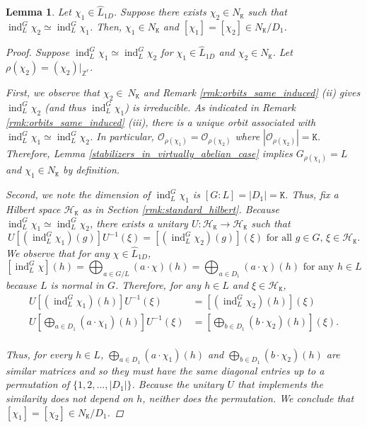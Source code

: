 \documentclass[11pt, twoside]{amsart}
\newcommand{\te}[1]{\operatorname{#1}}
\newcommand{\zn}{\mathbb{Z}}
\newcommand{\mc}{\mathcal}
\newcommand{\mt}{\mathtt}
\newcommand{\wh}{\widehat}
\renewcommand{\l}{\left}
\renewcommand{\r}{\right}
\newtheorem{lemma}[thm]{Lemma}
\theoremstyle{definition}
\begin{document}
\begin{lemma}\label{lemma: when_ind_is_irreducible}
Let $\chi_1\in\wh{L}_{1D}$. Suppose there exists $\chi_2\in N_{\mt K}$ such that $\te{ind}_L^G\chi_2\simeq \te{ind}_L^G\chi_1$. Then, $\chi_1\in N_{\mt K}$ and $[\chi_1]=[\chi_2]\in N_{\mt K}/D_1$.

\begin{proof}
    Suppose $\te{ind}_L^G\chi_1\simeq \te{ind}_L^G\chi_2$ for $\chi_1\in\wh{L}_{1D}$ and $\chi_2\in N_{\mt{K}}$. Let $\rho(\chi_2)=(\chi_2)|_{\zn^r}$.

    First, we observe that $\chi_2\in\ N_{\mt K}$ and Remark \ref{rmk:orbits_same_induced} (ii) gives $\te{ind}_L^G\chi_2$ (and thus $\te{ind}_L^G\chi_1$) is irreducible. As indicated in Remark \ref{rmk:orbits_same_induced} (iii), there is a unique orbit  associated with $\te{ind}_L^G\chi_1\simeq\te{ind}_L^G\chi_2$. In particular, $\mc{O}_{\rho(\chi_1)}=\mc{O}_{\rho(\chi_2)}$ where $|\mc{O}_{\rho(\chi_2)}|=\mt{K}$. Therefore, Lemma \ref{stabilizers_in_virtually_abelian_case} implies $G_{\rho(\chi_1)}=L$ and $\chi_1\in N_{\mt K}$ by definition.

    Second, we note the dimension of $\te{ind}_L^G \chi_1$ is $[G:L]=|D_1|={\mt{K}}$. Thus, fix a Hilbert space $\mc{H}_{\mt{K}}$ as in Section \ref{rmk:standard_hilbert}. Because $\te{ind}_L^G\chi_1\simeq \te{ind}_L^G\chi_2$, there exists a unitary $U:\mc{H}_{\mt{K}}\rightarrow \mc{H}_{\mt{K}}$ such that 
     \[U\l[\l(\te{ind}_L^G\chi_1\r)(g)\r]U^{-1}(\xi)=\l[\l(\te{ind}_L^G\chi_2\r)(g)\r](\xi)\text{ for all }g\in G,\,\xi\in \mc{H}_{\mt{K}}.\]
     We observe that for any $\chi\in\wh{L}_{1D}$,
     \[\l[\te{ind}_L^G\chi\r](h)=\bigoplus_{a\in G\slash L}(a\cdot \chi)(h)=\bigoplus_{a\in D_1}(a\cdot \chi)(h)\text{ for any }h\in L\]
     because $L$ is normal in $G$. Therefore, for any $h\in L$ and $\xi\in \mc{H}_{\mt{K}}$,
     \begin{align*}
     U\l[\l(\te{ind}_L^G\chi_1\r)(h)\r]U^{-1}(\xi)&=\l[\l(\te{ind}_L^G\chi_2\r)(h)\r](\xi)\\
     U\l[\bigoplus_{a\in D_1}(a\cdot \chi_1)(h)\r]U^{-1}(\xi)&=\l[\bigoplus_{b\in D_1}(b\cdot \chi_2)(h)\r](\xi).\\
     \end{align*}
     
    Thus, for every $h\in L$, $\bigoplus_{a\in D_1}(a\cdot \chi_1)(h)$ and $\bigoplus_{b\in D_1}(b\cdot \chi_2)(h)$ are similar matrices and so they must have the same diagonal entries up to a permutation of $\{1,2,...,|D_1|\}$. Because the unitary $U$ that implements the similarity does not depend on $h$, neither does the permutation. We conclude that $[\chi_1]=[\chi_2]\in N_{\mt{K}}\slash D_1$. \qedhere
\end{proof}


\end{lemma}
\end{document}
